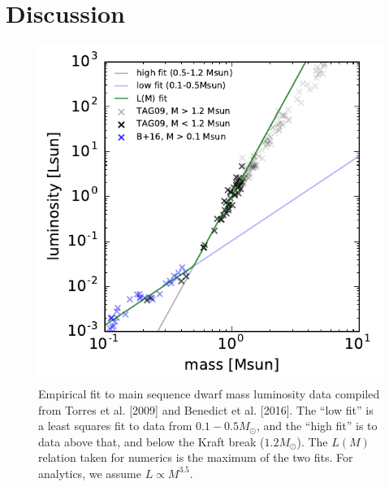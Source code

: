 \documentclass{emulateapj}
\begin{document}
\section{Discussion}
\label{sec:discussion}

\appendix
\begin{figure}[!t]
    \begin{center}
        \includegraphics[scale=0.9]{figures/mass_luminosity.pdf}
    \end{center}
    \caption{Empirical fit to main sequence dwarf mass luminosity data 
    compiled 
        from Torres et al. [2009] and Benedict et al. [2016]. The ``low fit'' 
        is a 
        least squares fit to data from $0.1-0.5M_\odot$, and the ``high fit'' 
        is 
        to 
        data above that, and below the Kraft break ($1.2M_\odot$).
        The $L(M)$ relation taken for numerics is the maximum 
        of the two fits. For analytics, we assume $L\propto M^{3.5}$.
    }
    \label{fig:mass_luminosity}
\end{figure}
\end{document}
